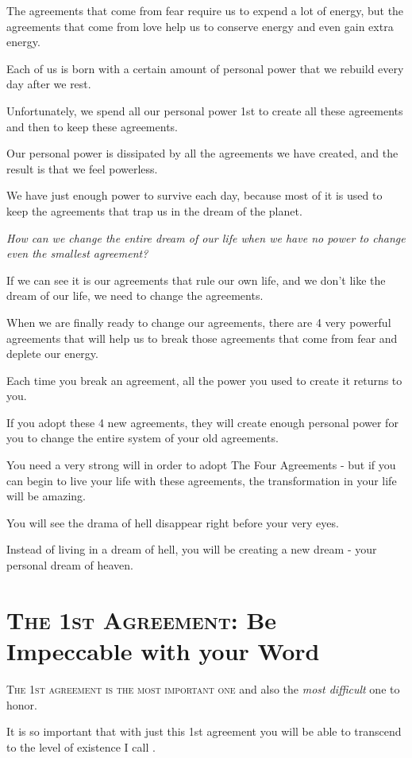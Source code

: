 \documentclass{article}
\numberwithin{equation}{section}
\begin{document}
The agreements that come from fear require us to expend a lot of energy, but the agreements that come from love help us to conserve energy and even gain extra energy.

%
Each of us is born with a certain amount of personal power that we rebuild every day after we rest.

Unfortunately, we spend all our personal power 1st to create all these agreements and then to keep these agreements.

Our personal power is dissipated by all the agreements we have created, and the result is that we feel powerless.

We have just enough power to survive each day, because most of it is used to keep the agreements that trap us in the dream of the planet.

\textit{How can we change the entire dream of our life when we have no power to change even the smallest agreement?}

%
If we can see it is our agreements that rule our own life, and we don't like the dream of our life, we need to change the agreements.

When we are finally ready to change our agreements, there are 4 very powerful agreements that will help us to break those agreements that come from fear and deplete our energy.

%
Each time you break an agreement, all the power you used to create it returns to you.

If you adopt these 4 new agreements, they will create enough personal power for you to change the entire system of your old agreements.

%
You need a very strong will in order to adopt The Four Agreements - but if you can begin to live your life with these agreements, the transformation in your life will be amazing.

You will see the drama of hell disappear right before your very eyes.

Instead of living in a dream of hell, you will be creating a new dream - your personal dream of heaven.

\section{\textsc{The 1st Agreement}: Be Impeccable with your Word}
\textsc{The 1st agreement is the most important one} and also the \textit{most difficult} one to honor.

It is so important that with just this 1st agreement you will be able to transcend to the level of existence I call .
\end{document}
